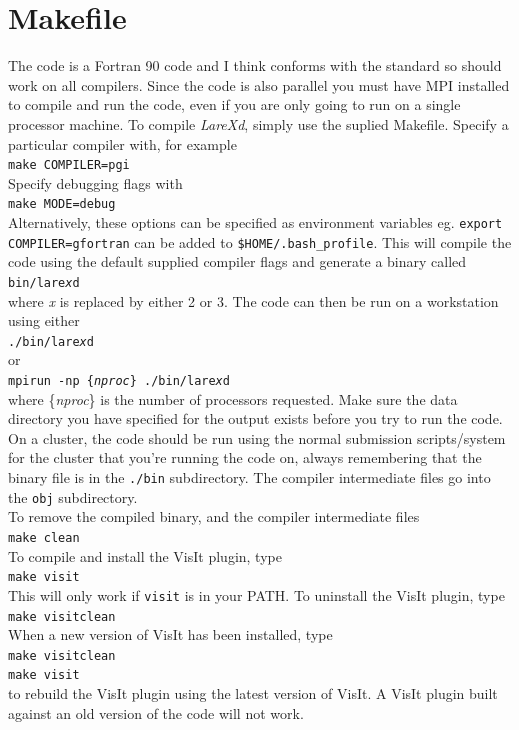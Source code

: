 \documentclass[11pt]{article}
\begin{document}
\section{Makefile}

The code is a Fortran 90 code and I think conforms with the standard so should work on all compilers. Since the code 
is also parallel you must have MPI installed to compile and run the code, even if you are only going to run on a single processor machine.
To compile {\it LareXd}, simply use the suplied Makefile. Specify a particular compiler with, for example \\
\texttt{make COMPILER=pgi}\\
Specify debugging flags with\\ 
\texttt{make MODE=debug}\\
Alternatively, these options can be specified as environment variables
eg. \texttt{export COMPILER=gfortran} can be added to \texttt{\$HOME/.bash\_profile}.
This will compile the code using the default supplied compiler flags and generate a binary called\\
\texttt{bin/lare{\it x}d}\\
where {\it x} is replaced by either 2 or 3. The code can then be run on a workstation using either\\
\texttt{./bin/lare{\it x}d}\\
or\\
\texttt{mpirun -np \{{\it nproc}\} ./bin/lare{\it x}d}\\
where \{{\it nproc}\} is the number of processors requested. Make sure the data directory you have specified for the output exists
before you try to run the code. On a cluster, the
code should be run using the normal submission scripts/system for the cluster
that you're running the code on, always remembering that the binary file is in
the \texttt{./bin} subdirectory. The compiler intermediate files go into the
\texttt{obj} subdirectory. \\

To remove the compiled binary, and the compiler intermediate files\\
\texttt{make clean}\\
To compile and install the VisIt plugin, type\\
\texttt{make visit}\\
This will only work if \texttt{visit} is in your PATH. To uninstall the VisIt plugin, type\\
\texttt{make visitclean}\\
When a new version of VisIt has been installed, type\\
\texttt{make visitclean}\\
\texttt{make visit}\\
to rebuild the VisIt plugin using the latest version of VisIt. A VisIt plugin built against an old version of the code will not work.
\end{document}
